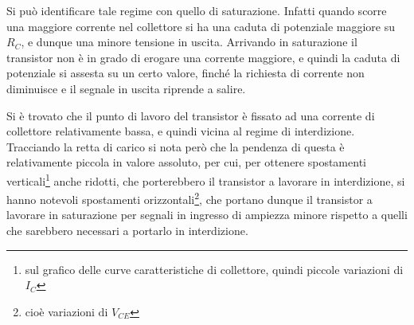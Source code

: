\documentclass[10pt,a4paper]{article}
\begin{document}
Si può identificare tale regime con quello di saturazione. Infatti quando scorre una maggiore corrente nel collettore si ha una caduta di potenziale maggiore su $R_C$, e dunque una minore tensione in uscita. Arrivando in saturazione il transistor non è in grado di erogare una corrente maggiore, e quindi la caduta di potenziale si assesta su un certo valore, finché la richiesta di corrente non diminuisce e il segnale in uscita riprende a salire.

Si è trovato che il punto di lavoro del transistor è fissato ad una corrente di collettore relativamente bassa, e quindi vicina al regime di interdizione. Tracciando la retta di carico si nota però che la pendenza di questa è relativamente piccola in valore assoluto, per cui, per ottenere spostamenti verticali\footnote{sul grafico delle curve caratteristiche di collettore, quindi piccole variazioni di $I_C$} anche ridotti, che porterebbero il transistor a lavorare in interdizione, si hanno notevoli spostamenti orizzontali\footnote{cioè variazioni di $V_{CE}$}, che portano dunque il transistor a lavorare in saturazione per segnali in ingresso di ampiezza minore rispetto a quelli che sarebbero necessari a portarlo in interdizione.
\end{document}
